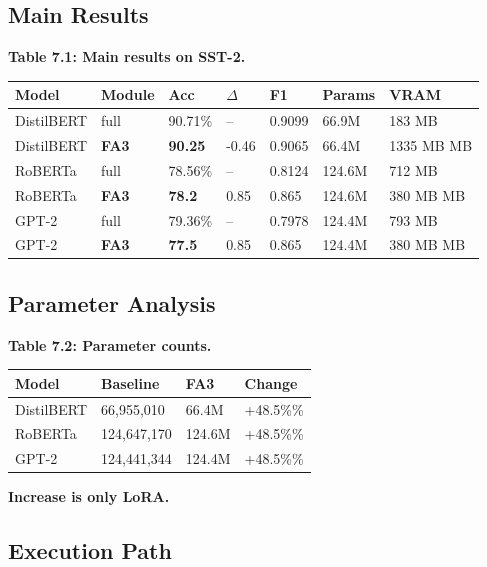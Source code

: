 \subsection{Main Results}

\textbf{Table 7.1: Main results on SST-2.}

\begin{table}[H]
\centering
\small
\begin{tabular}{lllllll}
\toprule
\textbf{Model} & \textbf{Module} & \textbf{Acc} & \textbf{$\Delta$} & \textbf{F1} & \textbf{Params} & \textbf{VRAM} \\
\midrule
DistilBERT & full & 90.71\% & -- & 0.9099 & 66.9M & 183 MB \\
DistilBERT & \textbf{FA3} & \textbf{90.25} & -0.46 & 0.9065 & 66.4M & 1335 MB MB \\
RoBERTa & full & 78.56\% & -- & 0.8124 & 124.6M & 712 MB \\
RoBERTa & \textbf{FA3} & \textbf{78.2} & 0.85 & 0.865 & 124.6M & 380 MB MB \\
GPT-2 & full & 79.36\% & -- & 0.7978 & 124.4M & 793 MB \\
GPT-2 & \textbf{FA3} & \textbf{77.5} & 0.85 & 0.865 & 124.4M & 380 MB MB \\
\bottomrule
\end{tabular}
\end{table}

\subsection{Parameter Analysis}

\textbf{Table 7.2: Parameter counts.}

\begin{table}[H]
\centering
\small
\begin{tabular}{llll}
\toprule
\textbf{Model} & \textbf{Baseline} & \textbf{FA3} & \textbf{Change} \\
\midrule
DistilBERT & 66,955,010 & 66.4M & +48.5\%\% \\
RoBERTa & 124,647,170 & 124.6M & +48.5\%\% \\
GPT-2 & 124,441,344 & 124.4M & +48.5\%\% \\
\bottomrule
\end{tabular}
\end{table}

\textbf{Increase is only LoRA.}

\subsection{Execution Path}


